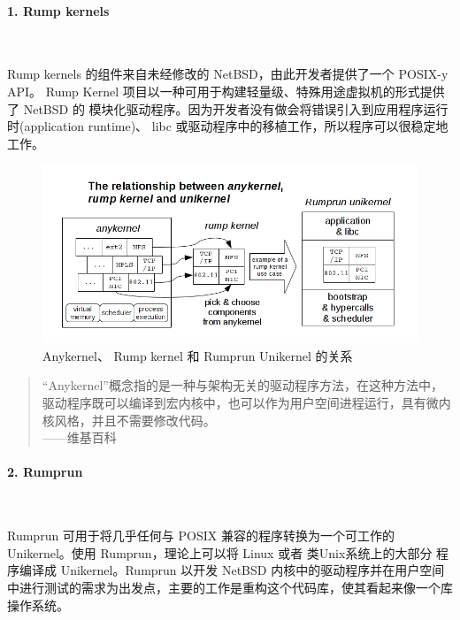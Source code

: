 \documentclass{../runikraft-report}
\begin{document}
\paragraph{1. Rump kernels}~

Rump kernels 的组件来自未经修改的 NetBSD，由此开发者提供了一个 POSIX-y API。
Rump Kernel 项目以一种可用于构建轻量级、特殊用途虚拟机的形式提供了 NetBSD 的
模块化驱动程序。因为开发者没有做会将错误引入到应用程序运行时(application runtime)、
libc 或驱动程序中的移植工作，所以程序可以很稳定地工作。\cite{bib:21-rump-kernel}
\begin{figure}[!hbt]
\includegraphics[width=\linewidth]{../assets/rumprun-1.png}
\caption{Anykernel、
Rump kernel 和 Rumprun Unikernel 的关系}
\end{figure}

\begin{quote}
“Anykernel”概念指的是一种与架构无关的驱动程序方法，在这种方法中，驱动程序既可以编译到宏内核中，也可以作为用户空间进程运行，具有微内核风格，并且不需要修改代码。\\
\hspace*{\fill}——维基百科
\end{quote}

\paragraph{2. Rumprun}~

Rumprun 可用于将几乎任何与 POSIX 兼容的程序转换为一个可工作的
Unikernel。使用 Rumprun，理论上可以将 Linux 或者 类Unix系统上的大部分
程序编译成 Unikernel。Rumprun 以开发 NetBSD 内核中的驱动程序并在用户空间
中进行测试的需求为出发点，主要的工作是重构这个代码库，使其看起来像一个库操作系统。\cite{bib:24-rumrun}
\end{document}

